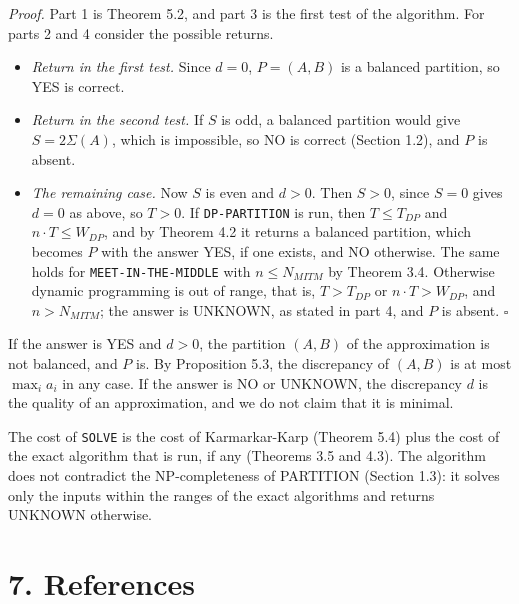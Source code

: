 \documentclass[
]{article}
\providecommand{\tightlist}{%
  \setlength{\itemsep}{0pt}\setlength{\parskip}{0pt}}
\begin{document}
\emph{Proof.} Part 1 is Theorem 5.2, and part 3 is the first test of the
algorithm. For parts 2 and 4 consider the possible returns.

\begin{itemize}
\tightlist
\item
  \emph{Return in the first test.} Since \(d = 0\), \(P = (A, B)\) is a
  balanced partition, so YES is correct.
\item
  \emph{Return in the second test.} If \(S\) is odd, a balanced
  partition would give \(S = 2\Sigma(A)\), which is impossible, so NO is
  correct (Section 1.2), and \(P\) is absent.
\item
  \emph{The remaining case.} Now \(S\) is even and \(d > 0\). Then
  \(S > 0\), since \(S = 0\) gives \(d = 0\) as above, so \(T > 0\). If
  \texttt{DP-PARTITION} is run, then \(T \le T_{DP}\) and
  \(n \cdot T \le W_{DP}\), and by Theorem 4.2 it returns a balanced
  partition, which becomes \(P\) with the answer YES, if one exists, and
  NO otherwise. The same holds for \texttt{MEET-IN-THE-MIDDLE} with
  \(n \le N_{MITM}\) by Theorem 3.4. Otherwise dynamic programming is
  out of range, that is, \(T > T_{DP}\) or \(n \cdot T > W_{DP}\), and
  \(n > N_{MITM}\); the answer is UNKNOWN, as stated in part 4, and
  \(P\) is absent. \(\square\)
\end{itemize}

If the answer is YES and \(d > 0\), the partition \((A, B)\) of the
approximation is not balanced, and \(P\) is. By Proposition 5.3, the
discrepancy of \((A, B)\) is at most \(\max_i a_i\) in any case. If the
answer is NO or UNKNOWN, the discrepancy \(d\) is the quality of an
approximation, and we do not claim that it is minimal.

The cost of \texttt{SOLVE} is the cost of Karmarkar-Karp (Theorem 5.4)
plus the cost of the exact algorithm that is run, if any (Theorems 3.5
and 4.3). The algorithm does not contradict the NP-completeness of
PARTITION (Section 1.3): it solves only the inputs within the ranges of
the exact algorithms and returns UNKNOWN otherwise.

\hypertarget{references}{%
\section{7. References}\label{references}}
\end{document}
